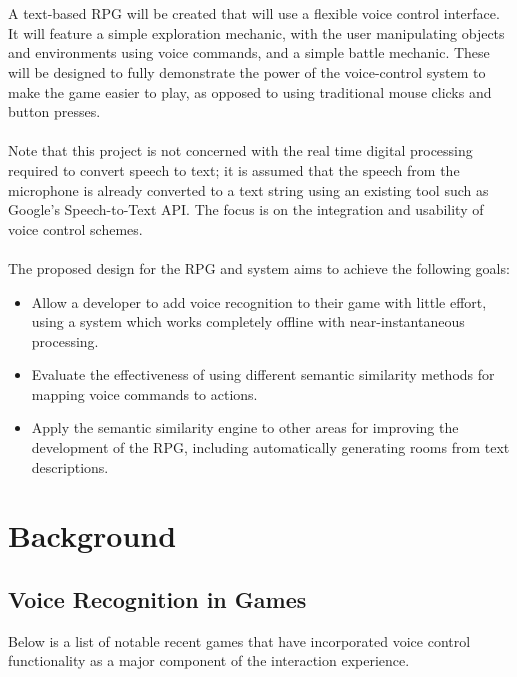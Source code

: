 \documentclass[11pt]{article}
\begin{document}
\\
\\
A text-based RPG will be created that will use a flexible voice control interface. It will feature a simple exploration mechanic, with the user manipulating objects and environments using voice commands, and a simple battle mechanic. These will be designed to fully demonstrate the power of the voice-control system to make the game easier to play, as opposed to using traditional mouse clicks and button presses.
\\
\\
Note that this project is not concerned with the real time digital processing required to convert speech to text; it is assumed that the speech from the microphone is already converted to a text string using an existing tool such as Google's Speech-to-Text API. The focus is on the integration and usability of voice control schemes.
\\
\\
The proposed design for the RPG and system aims to achieve the following goals:
\begin{itemize}
\item Allow a developer to add voice recognition to their game with little effort, using a system which works completely offline with near-instantaneous processing.
\item Evaluate the effectiveness of using different semantic similarity methods for mapping voice commands to actions.
\item Apply the semantic similarity engine to other areas for improving the development of the RPG, including automatically generating rooms from text descriptions.
\end{itemize}

\newpage
\section{Background}

\subsection{Voice Recognition in Games}
Below is a list of notable recent games that have incorporated voice control functionality as a major component of the interaction experience.
\end{document}
